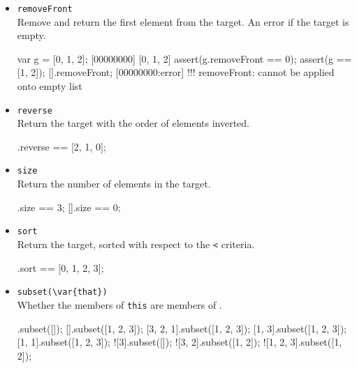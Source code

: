 \begin{itemize}
\begin{urbiscript}
var d = 1;
[00000000] 1
var e = [0, 1, d, 1, 2];
[00000000] [0, 1, 1, 1, 2]
assert(e.removeById(d) == [0, 1, 1, 2]);
assert(e == [0, 1, 1, 2]);
\end{urbiscript}

\item \lstinline|removeFront|\\
Remove and return the first element from the target. An error if the
target is empty.

\begin{urbiscript}
var g = [0, 1, 2];
[00000000] [0, 1, 2]
assert(g.removeFront == 0);
assert(g == [1, 2]);
[].removeFront;
[00000000:error] !!! removeFront: cannot be applied onto empty list
\end{urbiscript}

\item \lstinline|reverse|\\
Return the target with the order of elements inverted.

\begin{urbiassert}
[0, 1, 2].reverse == [2, 1, 0];
\end{urbiassert}

\item \lstinline|size|\\
Return the number of elements in the target.

\begin{urbiassert}
[0, 1, 2].size == 3;
[].size == 0;
\end{urbiassert}

\item \lstinline|sort|\\
Return the target, sorted with respect to the \lstinline|<| criteria.

\begin{urbiassert}
[1, 0, 3, 2].sort == [0, 1, 2, 3];
\end{urbiassert}

\item \lstinline|subset(\var{that})|\\
  Whether the members of \lstinline|this| are members of .

\begin{urbiassert}
[].subset([]);
[].subset([1, 2, 3]);
[3, 2, 1].subset([1, 2, 3]);
[1, 3].subset([1, 2, 3]);
[1, 1].subset([1, 2, 3]);
![3].subset([]);
![3, 2].subset([1, 2]);
![1, 2, 3].subset([1, 2]);
\end{urbiassert}


\end{itemize}
